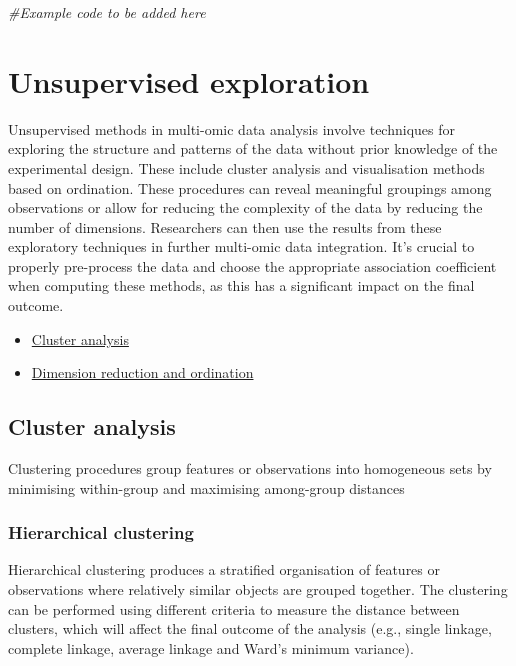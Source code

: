 \documentclass[
]{book}
\newenvironment{Shaded}{\begin{snugshade}}{\end{snugshade}}
\newcommand{\CommentTok}[1]{\textcolor[rgb]{0.56,0.35,0.01}{\textit{#1}}}
\providecommand{\tightlist}{%
  \setlength{\itemsep}{0pt}\setlength{\parskip}{0pt}}
\begin{document}
\begin{Shaded}
\begin{Highlighting}[]
\CommentTok{\#Example code to be added here}
\end{Highlighting}
\end{Shaded}

\hypertarget{unsupervised-exploration}{%
\chapter{Unsupervised exploration}\label{unsupervised-exploration}}

Unsupervised methods in multi-omic data analysis involve techniques for exploring the structure and patterns of the data without prior knowledge of the experimental design. These include cluster analysis and visualisation methods based on ordination. These procedures can reveal meaningful groupings among observations or allow for reducing the complexity of the data by reducing the number of dimensions. Researchers can then use the results from these exploratory techniques in further multi-omic data integration. It's crucial to properly pre-process the data and choose the appropriate association coefficient when computing these methods, as this has a significant impact on the final outcome.

\begin{itemize}
\tightlist
\item
  \protect\hyperlink{cluster-analysis}{Cluster analysis}
\item
  \protect\hyperlink{dimension-reduction-ordination}{Dimension reduction and ordination}
\end{itemize}

\hypertarget{cluster-analysis}{%
\section{Cluster analysis}\label{cluster-analysis}}

Clustering procedures group features or observations into homogeneous sets by minimising within-group and maximising among-group distances

\hypertarget{hierarchical-clustering}{%
\subsection{Hierarchical clustering}\label{hierarchical-clustering}}

Hierarchical clustering produces a stratified organisation of features or observations where relatively similar objects are grouped together. The clustering can be performed using different criteria to measure the distance between clusters, which will affect the final outcome of the analysis (e.g., single linkage, complete linkage, average linkage and Ward's minimum variance).
\end{document}
